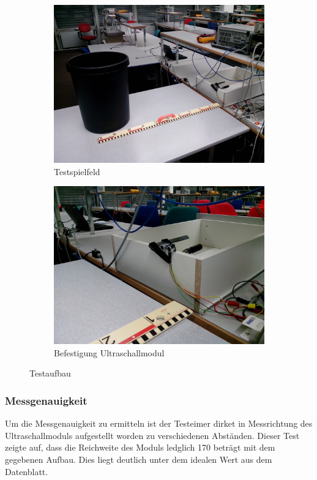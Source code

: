 \begin{figure}[h!]
	\centering
	\begin{subfigure}[b]{0.45\textwidth}
		\includegraphics[width=\textwidth]{../../fig/HC-SR04_01.jpg}
		\caption{Testspielfeld}
	\end{subfigure}
	\begin{subfigure}[b]{0.45\textwidth}
		\includegraphics[width=\textwidth]{../../fig/HC-SR04_02.jpg}
		\caption{Befestigung Ultraschallmodul}
	\end{subfigure}
	\caption{Testaufbau}
	\label{fig:testaufbau_hcsr04}
\end{figure}

\subsubsection{Messgenauigkeit}
Um die Messgenauigkeit zu ermitteln ist der Testeimer dirket in Messrichtung
des Ultraschallmoduls aufgestellt worden zu verschiedenen Abständen. Dieser
Test zeigte auf, dass die Reichweite des Moduls ledglich 170 beträgt mit dem
gegebenen Aufbau. Dies liegt deutlich unter dem idealen Wert aus dem 
Datenblatt.

